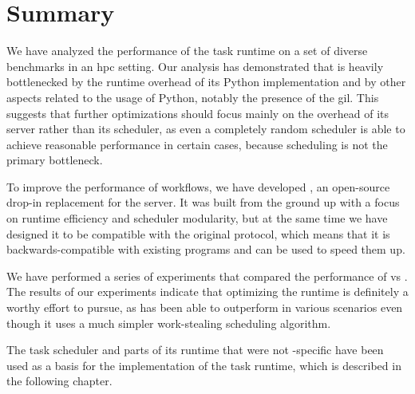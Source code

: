 \section*{Summary}
We have analyzed the performance of the \dask{} task runtime on a set of
diverse benchmarks in an \gls{hpc} setting. Our analysis has demonstrated that
\dask{} is heavily bottlenecked by the runtime overhead of its Python
implementation and by other aspects related to the usage of Python, notably the presence of the
\gls{gil}. This suggests that further optimizations should focus mainly on the
overhead of its server rather than its scheduler, as even a completely random scheduler is able to
achieve reasonable performance in certain cases, because scheduling is not the primary bottleneck.

To improve the performance of \dask{} workflows, we have developed
\rsds{}, an open-source drop-in replacement for the \dask{}
server. It was built from the ground up with a focus on runtime efficiency and scheduler
modularity, but at the same time we have designed it to be compatible with the original
\dask{} protocol, which means that it is backwards-compatible with existing
\dask{} programs and can be used to speed them up.

We have performed a series of experiments that compared the performance of
\rsds{} vs \dask{}. The results of our experiments indicate
that optimizing the runtime is definitely a worthy effort to pursue, as \rsds{}
has been able to outperform \dask{} in various scenarios even though it uses a
much simpler work-stealing scheduling algorithm.

The \rsds{} task scheduler and parts of its runtime that were not
\dask{}-specific have been used as a basis for the implementation of the
\hyperqueue{} task runtime, which is described in the following chapter.

